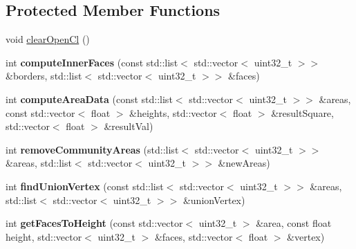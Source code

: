 \subsection*{Protected Member Functions}
\begin{DoxyCompactItemize}
\item 
void \mbox{\hyperlink{class_c_water_open_c_l_a213bd842a23c3a1d50e90b60d9395143}{clear\+Open\+Cl}} ()
\item 
\mbox{\label{class_c_water_open_c_l_af270a8ce81a691fd166ef1548a740d75}} 
int {\bfseries compute\+Inner\+Faces} (const std\+::list$<$ std\+::vector$<$ uint32\+\_\+t $>$$>$ \&borders, std\+::list$<$ std\+::vector$<$ uint32\+\_\+t $>$$>$ \&faces)
\item 
\mbox{\label{class_c_water_open_c_l_a30713ebb73035f4b64dbf2a392b33d72}} 
int {\bfseries compute\+Area\+Data} (const std\+::list$<$ std\+::vector$<$ uint32\+\_\+t $>$$>$ \&areas, const std\+::vector$<$ float $>$ \&heights, std\+::vector$<$ float $>$ \&result\+Square, std\+::vector$<$ float $>$ \&result\+Val)
\item 
\mbox{\label{class_c_water_open_c_l_a67e69f0d1a0b9139bde5c8ded6a9137e}} 
int {\bfseries remove\+Community\+Areas} (std\+::list$<$ std\+::vector$<$ uint32\+\_\+t $>$$>$ \&areas, std\+::list$<$ std\+::vector$<$ uint32\+\_\+t $>$$>$ \&new\+Areas)
\item 
\mbox{\label{class_c_water_open_c_l_aad6a697a2579f3679a7574aaa30bb7ef}} 
int {\bfseries find\+Union\+Vertex} (const std\+::list$<$ std\+::vector$<$ uint32\+\_\+t $>$$>$ \&areas, std\+::list$<$ std\+::vector$<$ uint32\+\_\+t $>$$>$ \&union\+Vertex)
\item 
\mbox{\label{class_c_water_open_c_l_a6500cbf0c77d5b262374d69763de09a0}} 
int {\bfseries get\+Faces\+To\+Height} (const std\+::vector$<$ uint32\+\_\+t $>$ \&area, const float height, std\+::vector$<$ uint32\+\_\+t $>$ \&faces, std\+::vector$<$ float $>$ \&vertex)
\end{DoxyCompactItemize}
